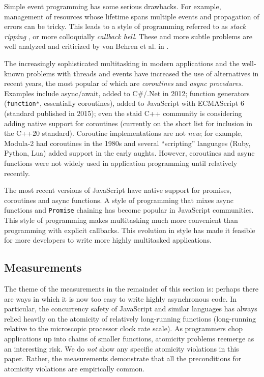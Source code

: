 \documentclass[acmsmall,anonymous,review]{acmart}\settopmatter{printfolios=true,printccs=false,printacmref=false}
\begin{document}
Simple event programming has some serious drawbacks.
For example, management of resources whose lifetime spans multiple events and propagation of errors can be tricky.
This leads to a style of programming referred to as \emph{stack ripping} \cite{Adya2002}, or more colloquially \emph{callback hell}.
These and more subtle problems are well analyzed and criticized by von Behren et al. in \cite{Behren2003a}.

The increasingly sophisticated multitasking in modern applications and the well-known problems with threads and events have increased the use of alternatives in recent years, the most popular of which are \emph{coroutines} and \emph{async procedures}.
Examples include async/await, added to C\#/.Net in 2012; function generators (\texttt{function*}, essentially coroutines), added to JavaScript with ECMAScript 6 (standard published in 2015); even the staid C++ community is considering adding native support for coroutines (currently on the short list for inclusion in the C++20 standard).
Coroutine implementations are not \emph{new}; for example, Modula-2 had coroutines in the 1980s and several ``scripting'' languages (Ruby, Python, Lua) added support in the early aughts.
However, coroutines and async functions were not widely used in application programming until relatively recently.

The most recent versions of JavaScript have native support for promises, coroutines and async functions.
A style of programming that mixes async functions and \texttt{Promise} chaining has become popular in JavaScript communities.
This style of programming makes multitasking much more convenient than programming with explicit callbacks.
This evolution in style has made it feasible for more developers to write more highly multitasked applications.

\subsection{Measurements}

The theme of the measurements in the remainder of this section is: perhaps there are ways in which it is now too easy to write highly asynchronous code.
In particular, the concurrency safety of JavaScript and similar languages has always relied heavily on the atomicity of relatively long-running functions (long-running relative to the microscopic processor clock rate scale).
As programmers chop applications up into chains of smaller functions, atomicity problems reemerge as an interesting risk.
We do \emph{not} show any specific atomicity violations in this paper.
Rather, the measurements demonstrate that all the preconditions for atomicity violations are empirically common.
\end{document}
